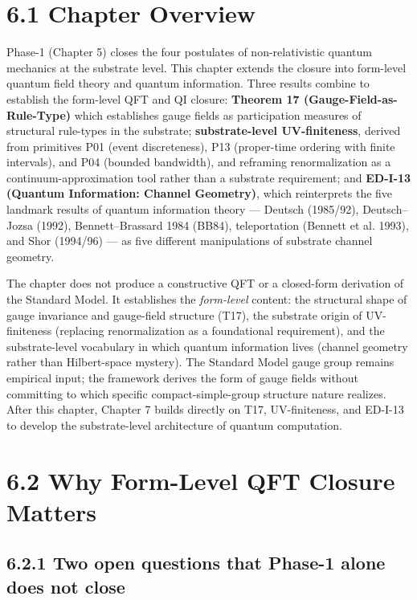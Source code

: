 \documentclass[11pt]{book}
\begin{document}
\section{6.1 Chapter Overview}

Phase-1 (Chapter 5) closes the four postulates of non-relativistic quantum mechanics at the substrate level. This chapter extends the closure into form-level quantum field theory and quantum information. Three results combine to establish the form-level QFT and QI closure: \textbf{Theorem 17 (Gauge-Field-as-Rule-Type)} which establishes gauge fields as participation measures of structural rule-types in the substrate; \textbf{substrate-level UV-finiteness}, derived from primitives P01 (event discreteness), P13 (proper-time ordering with finite intervals), and P04 (bounded bandwidth), and reframing renormalization as a continuum-approximation tool rather than a substrate requirement; and \textbf{ED-I-13 (Quantum Information: Channel Geometry)}, which reinterprets the five landmark results of quantum information theory — Deutsch (1985/92), Deutsch–Jozsa (1992), Bennett–Brassard 1984 (BB84), teleportation (Bennett et al. 1993), and Shor (1994/96) — as five different manipulations of substrate channel geometry.

The chapter does not produce a constructive QFT or a closed-form derivation of the Standard Model. It establishes the \textit{form-level} content: the structural shape of gauge invariance and gauge-field structure (T17), the substrate origin of UV-finiteness (replacing renormalization as a foundational requirement), and the substrate-level vocabulary in which quantum information lives (channel geometry rather than Hilbert-space mystery). The Standard Model gauge group remains empirical input; the framework derives the form of gauge fields without committing to which specific compact-simple-group structure nature realizes. After this chapter, Chapter 7 builds directly on T17, UV-finiteness, and ED-I-13 to develop the substrate-level architecture of quantum computation.

\section{6.2 Why Form-Level QFT Closure Matters}

\subsection{6.2.1 Two open questions that Phase-1 alone does not close}
\end{document}
